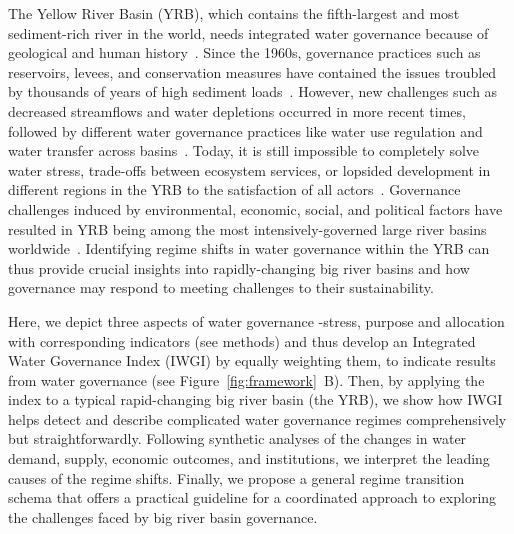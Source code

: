 The Yellow River Basin (YRB), which contains the fifth-largest and most sediment-rich river in the world, needs integrated water governance because of geological and human history~\cite{mostern2021,best2019}.
Since the 1960s, governance practices such as reservoirs, levees, and conservation measures have contained the issues troubled by thousands of years of high sediment loads~\cite{wang2016a,song2020}.
However, new challenges such as decreased streamflows and water depletions occurred in more recent times, followed by different water governance practices like water use regulation and water transfer across basins~\cite{wang2019c}.
Today, it is still impossible to completely solve water stress, trade-offs between ecosystem services, or lopsided development in different regions in the YRB to the satisfaction of all actors~\cite{wohlfart2016}.
Governance challenges induced by environmental, economic, social, and political factors have resulted in YRB being among the most intensively-governed large river basins worldwide~\cite{nickum2021}.
Identifying regime shifts in water governance within the YRB can thus provide crucial insights into rapidly-changing big river basins and how governance may respond to meeting challenges to their sustainability.

Here, we depict three aspects of water governance -stress, purpose and allocation with corresponding indicators (see methods) and thus develop an Integrated Water Governance Index (IWGI) by equally weighting them, to indicate results from water governance (see Figure~\ref{fig:framework}~B).
Then, by applying the index to a typical rapid-changing big river basin (the YRB), we show how IWGI helps detect and describe complicated water governance regimes comprehensively but straightforwardly.
Following synthetic analyses of the changes in water demand, supply, economic outcomes, and institutions, we interpret the leading causes of the regime shifts.
Finally, we propose a general regime transition schema that offers a practical guideline for a coordinated approach to exploring the challenges faced by big river basin governance.
